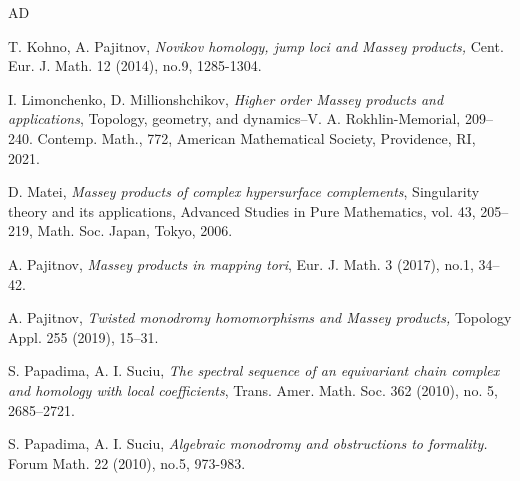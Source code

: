 \documentclass[12pt,leqno,twoside]{amsart}
\theoremstyle{plain}
\theoremstyle{definition}
\begin{document}
\begin{thebibliography}{AD}


 T. Kohno, A. Pajitnov,  {\it Novikov homology, jump loci and Massey products,} Cent. Eur. J. Math. 12 (2014), no.9, 1285-1304.


 I. Limonchenko, D. Millionshchikov, {\it Higher order Massey products and applications}, Topology, geometry, and dynamics--V. A. Rokhlin-Memorial, 209--240. Contemp. Math., 772, American Mathematical Society, Providence, RI, 2021. 

 D. Matei, {\it Massey products of complex hypersurface complements}, Singularity theory and its applications, Advanced Studies in Pure Mathematics, vol. 43, 205--219, Math. Soc. Japan, Tokyo, 2006.



 A. Pajitnov, {\it Massey products in mapping tori}, Eur. J. Math. 3 (2017), no.1, 34--42.


 A. Pajitnov, {\it  Twisted monodromy homomorphisms and Massey products,} Topology Appl. 255 (2019), 15--31.


 S. Papadima, A. I. Suciu, {\it The spectral sequence of an equivariant chain complex and homology with local coefficients}, Trans. Amer. Math. Soc. 362 (2010), no. 5, 2685--2721. 

 S. Papadima, A. I. Suciu, {\it Algebraic monodromy and obstructions to formality.} Forum Math. 22 (2010), no.5, 973-983.




\end{thebibliography}
\end{document}
